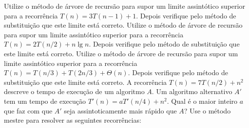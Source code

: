 \documentclass[a4paper]{exam}
\begin{document}
\begin{questions}
  \question Utilize o método de árvore de recursão para supor um
  limite assintótico superior para a recorrência \linebreak
  $T(n) = 3T(n-1) + 1$. Depois verifique pelo método de
  substituição que este limite está correto.
  \question Utilize o método de árvore de recursão para supor um
  limite assintótico superior para a recorrência \linebreak
  $T(n) = 2T(n/2) + n \lg n$. Depois verifique pelo método de
  substituição que este limite está correto. 
  \question Utilize o método de árvore de recursão para supor um
  limite assintótico superior para a recorrência \linebreak $T(n) = T(n/3) +
  T(2n/3) + \Theta(n)$. Depois verifique pelo método de
  substituição que este limite está correto.
  \question A recorrência $T(n) = 7T(n/2) + n^2$ descreve o
  tempo de execução de um algoritmo $A$. Um algoritmo alternativo $A'$ 
  tem um tempo de execução $T'(n) = aT'(n/4) + n^2$. Qual é o maior
  inteiro $a$ que faz com que $A'$ seja assintoticamente mais rápido
  que $A$?
  \question Use o método mestre para resolver as seguintes
  recorrências: 
\end{questions}
\end{document}
